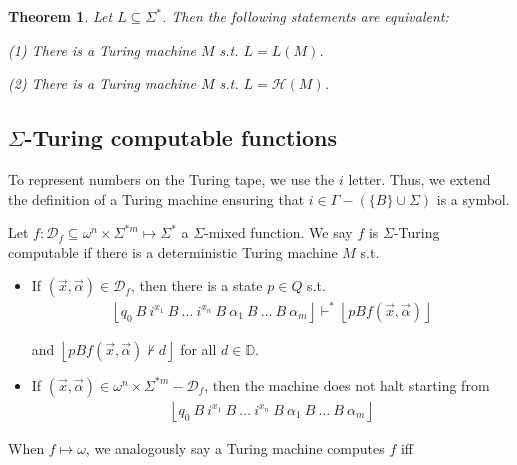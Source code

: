 \documentclass[a4paper, 12pt]{article}
\newtheorem{theorem}{Theorem}
\newtheorem{theorem}{Theorem}
\begin{document}
\begin{theorem}
    Let $L \subseteq \Sigma^{*}$. Then the following statements are equivalent: 

    \textit{(1)} There is a Turing machine $M$ s.t. $L = L(M)$. 

    \textit{(2)} There is a Turing machine $M$ s.t. $L = \mathcal{H}(M)$.
\end{theorem}

\subsection{$\Sigma$-Turing computable functions}

To represent numbers on the Turing tape, we use the $i$ letter. Thus, we extend
the definition of a Turing machine ensuring that $i \in  \Gamma - \left( \{B\}
\cup \Sigma \right) $ is a symbol.

Let $f : \mathcal{D}_f \subseteq \omega^{n} \times \Sigma^{*m} \mapsto
\Sigma^{*}$ a $\Sigma$-mixed function. We say $f$ is $\Sigma$-Turing computable
if there is a deterministic Turing machine $M$ s.t. 

\begin{itemize}
    \item If $(\vec{x}, \vec{\alpha}) \in \mathcal{D}_f$, then there is a state
        $p \in Q$ s.t. 
        \begin{align*}
            \left\lfloor q_0 ~ B ~ i^{x_1} ~ B ~ \ldots ~ i^{x_n} ~ B ~ \alpha_1
            ~ B ~ \ldots ~ B ~ \alpha_m\right\rfloor \vdash^* \left\lfloor pB
            f(\vec{x}, \vec{\alpha}) \right\rfloor
        \end{align*} 

        and $\left\lfloor pBf(\vec{x}, \vec{\alpha}) \not\vdash d \right\rfloor$
        for all $d \in \mathbb{D}$.

    \item If $(\vec{x}, \vec{\alpha}) \in \omega^{n} \times \Sigma^{*m} -
        \mathcal{D}_f$, then the machine does not halt starting from  
        \begin{align*}
            \left\lfloor q_0 ~ B ~ i^{x_1} ~ B ~ \ldots ~ i^{x_n} ~ B ~ \alpha_1
            ~ B ~ \ldots ~ B ~ \alpha_m\right\rfloor 
        \end{align*}
\end{itemize}

When $f \mapsto \omega$, we analogously say a Turing machine computes $f$ iff
\end{document}

